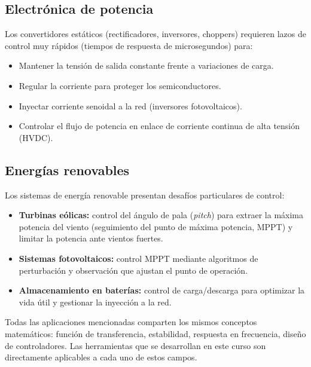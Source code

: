 \subsection{Electrónica de potencia}

Los convertidores estáticos (rectificadores, inversores, choppers) requieren
lazos de control muy rápidos (tiempos de respuesta de microsegundos) para:

\begin{itemize}
  \item Mantener la tensión de salida constante frente a variaciones de carga.
  \item Regular la corriente para proteger los semiconductores.
  \item Inyectar corriente senoidal a la red (inversores fotovoltaicos).
  \item Controlar el flujo de potencia en enlace de corriente continua de alta
    tensión (HVDC).
\end{itemize}

\subsection{Energías renovables}

Los sistemas de energía renovable presentan desafíos particulares de control:

\begin{itemize}
  \item \textbf{Turbinas eólicas:} control del ángulo de pala (\textit{pitch})
    para extraer la máxima potencia del viento (seguimiento del punto de máxima
    potencia, MPPT) y limitar la potencia ante vientos fuertes.
  \item \textbf{Sistemas fotovoltaicos:} control MPPT mediante algoritmos
    de perturbación y observación que ajustan el punto de operación.
  \item \textbf{Almacenamiento en baterías:} control de carga/descarga para
    optimizar la vida útil y gestionar la inyección a la red.
\end{itemize}

\begin{nota}
  Todas las aplicaciones mencionadas comparten los mismos conceptos
  matemáticos: función de transferencia, estabilidad, respuesta en frecuencia,
  diseño de controladores. Las herramientas que se desarrollan en este curso
  son directamente aplicables a cada uno de estos campos.
\end{nota}

